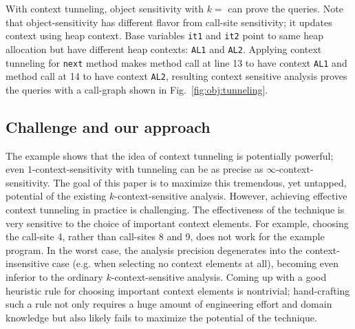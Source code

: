  With context
tunneling, object sensitivity with $k = $ can prove the queries. Note that
object-sensitivity has different flavor from call-site sensitivity; it
updates context using heap context. Base variables \texttt{it1} and
\texttt{it2} point to same heap allocation but have different heap contexts:
\texttt{AL1} and \texttt{AL2}. Applying context tunneling for \texttt{next}
method makes method call at line 13 to have context \texttt{AL1} and method
call at 14 to have context \texttt{AL2}, resulting context sensitive analysis
proves the queries with a call-graph shown in Fig.~\ref{fig:obj:tunneling}.

\subsection{Challenge and our approach }


The example shows that the idea of context tunneling is potentially
powerful; even $1$-context-sensitivity with
tunneling can be as precise as
$\infty$-context-sensitivity. The goal of this paper is to maximize
this tremendous, yet untapped, potential of the existing $k$-context-sensitive analysis.
However, achieving effective context tunneling in practice is
challenging. The effectiveness of the technique is very sensitive
to the choice of important context elements.  For example,
choosing the call-site 4, rather than call-sites 8 and 9, does not
work for the example program.  In the worst case, the analysis
precision degenerates into the context-insensitive case (e.g. when
selecting no context elements at all), becoming even inferior to the
ordinary
$k$-context-sensitive analysis.  Coming up with a good
heuristic rule for choosing important context elements is nontrivial;
hand-crafting such a rule not only requires a huge amount of
engineering effort and domain knowledge but also likely fails to
maximize the potential of the technique.




